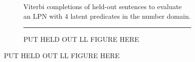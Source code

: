 \documentclass{article} %
\begin{document}
\begin{figure}
\begin{subfigure}{0.45\linewidth}
\begin{tabular}{>{\footnotesize} l >{\footnotesize} l}
      \end{tabular}
      \caption{Viterbi completions of held-out sentences to evaluate an LPN with 4 latent predicates in the number domain.}
      \label{tab:results}
  \end{subfigure}
  \hfill
  \begin{subfigure}{0.45\linewidth}
    \rule{6cm}{2.5cm}
    \caption{PUT HELD OUT LL FIGURE HERE}
    \label{fig:heldoutLL}
  \end{subfigure}
\end{figure}
\end{document}
